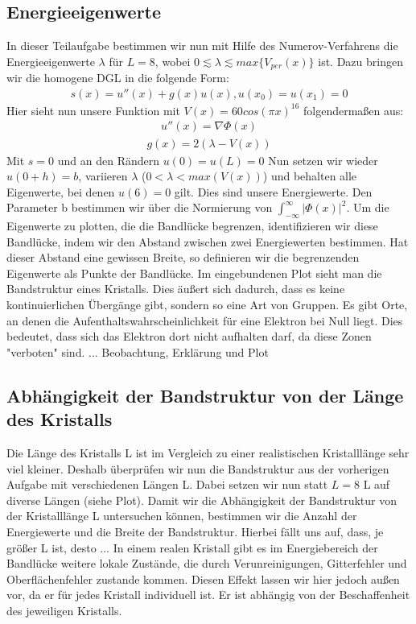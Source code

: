 \documentclass[ngerman]{scrartcl}
\begin{document}
\subsection{Energieeigenwerte}
In dieser Teilaufgabe bestimmen wir nun mit Hilfe des Numerov-Verfahrens die Energieeigenwerte $\lambda$ für $L = 8$, wobei $0 \lesssim \lambda \lesssim max \{V_{per}(x)\}$ ist. Dazu bringen wir die homogene DGL in die folgende Form:
\begin{align}
s(x) = u''(x) + g(x) u(x), u(x_0) = u(x_1) = 0
\end{align}
Hier sieht nun unsere Funktion mit $V(x) = 60 cos(\pi x)^{16}$ folgendermaßen aus:
\begin{align}
u''(x) = \nabla \Phi(x)
\end{align}
\begin{align}
g(x) = 2(\lambda - V(x))
\end{align}
Mit $s = 0$ und an den Rändern $u(0) = u(L) = 0$
Nun setzen wir wieder $u(0 + h) = b$, variieren $\lambda$ ($0 < \lambda < max(V(x))$) und behalten alle Eigenwerte, bei denen $u(6) = 0$ gilt. Dies sind unsere Energiewerte. Den Parameter b bestimmen wir über die Normierung von $\int_{-\infty}^{\infty} |\Phi(x)|^2$. Um die Eigenwerte zu plotten, die die Bandlücke begrenzen, identifizieren wir diese Bandlücke, indem wir den Abstand zwischen zwei Energiewerten bestimmen. Hat dieser Abstand eine gewissen Breite, so definieren wir die begrenzenden Eigenwerte als Punkte der Bandlücke. 
\newline
Im eingebundenen Plot sieht man die Bandstruktur eines Kristalls. Dies äußert sich dadurch, dass es keine kontinuierlichen Übergänge gibt, sondern so eine Art von Gruppen. Es gibt Orte, an denen die Aufenthaltswahrscheinlichkeit für eine Elektron bei Null liegt. Dies bedeutet, dass sich das Elektron dort nicht aufhalten darf, da diese Zonen "verboten" sind.\newline
... Beobachtung, Erklärung und Plot \newline 

\subsection{Abhängigkeit der Bandstruktur von der Länge des Kristalls}
Die Länge des Kristalls L ist im Vergleich zu einer realistischen Kristalllänge sehr viel kleiner. Deshalb überprüfen wir nun die Bandstruktur aus der vorherigen Aufgabe mit verschiedenen Längen L. Dabei setzen wir nun statt $L=8$ L auf diverse Längen (siehe Plot). Damit wir die Abhängigkeit der Bandstruktur von der Kristalllänge L untersuchen können, bestimmen wir die Anzahl der Energiewerte und die Breite der Bandstruktur. \newline
Hierbei fällt uns auf, dass, je größer L ist, desto \newline ... \newline
In einem realen Kristall gibt es im Energiebereich der Bandlücke weitere lokale Zustände, die durch Verunreinigungen, Gitterfehler und Oberflächenfehler zustande kommen. Diesen Effekt lassen wir hier jedoch außen vor, da er für jedes Kristall individuell ist. Er ist abhängig von der Beschaffenheit des jeweiligen Kristalls. 
\end{document}
